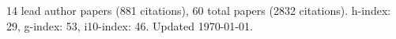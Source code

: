 14 lead author papers (881 citations),
60 total papers (2832 citations).\newline
h-index: 29, g-index: 53, i10-index: 46. Updated \today.